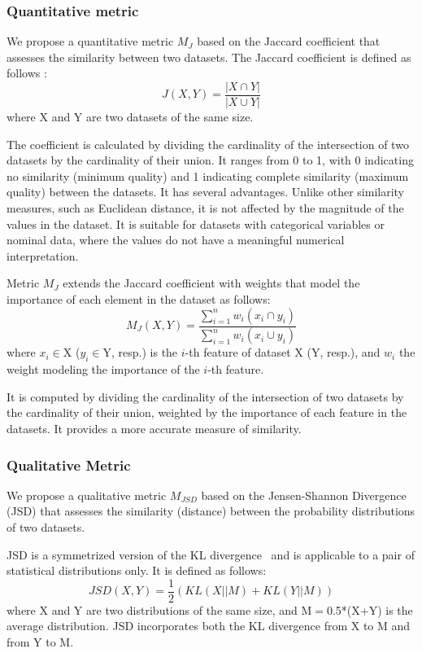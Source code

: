 \subsubsection{Quantitative metric}
We propose a quantitative metric $M_J$ based on the Jaccard coefficient that assesses the similarity between two datasets. The Jaccard coefficient is defined as follows \cite{RAHMAN20102707}: \[J(X,Y) = \frac{|X \cap Y|}{|X \cup Y|}\]
where X and Y are two datasets of the same size.

The coefficient is calculated by dividing the cardinality of the intersection of two datasets by the cardinality of their union. It ranges from 0 to 1, with 0 indicating no similarity (minimum quality) and 1 indicating complete similarity (maximum quality) between the datasets. It has several advantages. Unlike other similarity measures, such as Euclidean distance, it is not affected by the magnitude of the values in the dataset. It is suitable for datasets with categorical variables or nominal data, where the values do not have a meaningful numerical interpretation.

Metric $M_J$ extends the Jaccard coefficient with weights that model the importance of each element in the dataset as follows:\[M_J(X,Y) = \frac{\sum_{i=1}^{n}w_i(x_i \cap y_i)}{\sum_{i=1}^{n}w_i(x_i \cup y_i)}\]
where $x_i$$\in$X ($y_i$$\in$Y, resp.) is the $i$-th feature of dataset X (Y, resp.), and $w_i$ the weight modeling the importance of the $i$-th feature.

It is computed by dividing the cardinality of the intersection of two datasets by the cardinality of their union, weighted by the importance of each feature in the datasets. It provides a more accurate measure of similarity.

\subsubsection{Qualitative Metric}
We propose a qualitative metric $M_{JSD}$ based on the Jensen-Shannon Divergence (JSD) that assesses the similarity (distance) between the probability distributions of two datasets.

JSD is a symmetrized version of the KL divergence~\cite{Fuglede} and is applicable to a pair of statistical distributions only. It is defined as follows:
\[JSD(X, Y) = \frac{1}{2} \left( KL(X || M)
  + KL(Y || M) \right)\]
%
where X and Y are two distributions of the same size, and M$=$0.5*(X+Y) is the average distribution.
JSD incorporates both the KL divergence from X to M and from Y to M.

